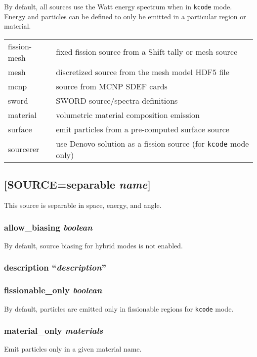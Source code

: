 \documentclass[10pt]{article}
\begin{document}
By default, all sources use the Watt energy spectrum when in \texttt{kcode} mode. Energy and particles can be defined to only be emitted in a particular region or material.\newline

\begin{tabular}{l l}
fission-mesh & fixed fission source from a Shift tally or mesh source\\
mesh & discretized source from the mesh model HDF5 file\\
mcnp & source from MCNP SDEF cards\\
sword & SWORD source/spectra definitions\\
material & volumetric material composition emission\\
surface & emit particles from a pre-computed surface source\\
sourcerer & use Denovo solution as a fission source (for \texttt{kcode} mode only)\\
\end{tabular}

\subsection{[SOURCE=separable \textit{name}]}
This source is separable in space, energy, and angle.

\subsubsection{allow\_biasing \textit{boolean}}
By default, source biasing for hybrid modes is not enabled.

\subsubsection{description ``\textit{description}''}

\subsubsection{fissionable\_only \textit{boolean}}
By default, particles are emitted only in fissionable regions for \texttt{kcode} mode. 

\subsubsection{material\_only \textit{materials}}
Emit particles only in a given material name.
\end{document}
